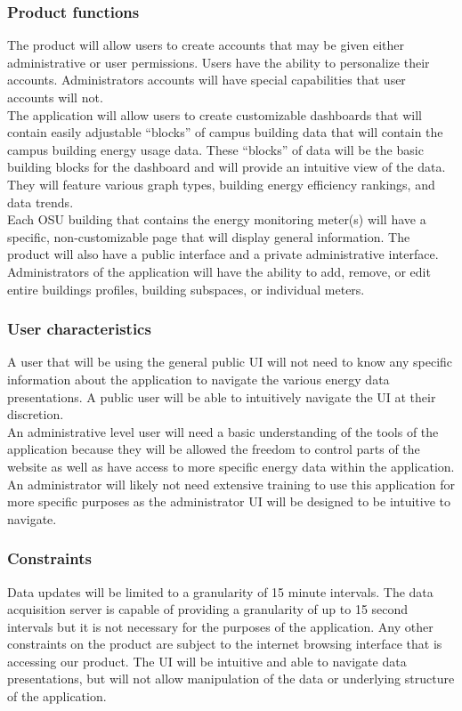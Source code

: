     \subsubsection{Product functions}
    The product will allow users to create accounts that may be given either administrative or user permissions. Users have the ability to personalize their accounts. Administrators accounts will have special capabilities that user accounts will not. \\
    The application will allow users to create customizable dashboards that will contain easily adjustable “blocks” of campus building data that will contain the campus building energy usage data. These “blocks” of data will be the basic building blocks for the dashboard and will provide an intuitive view of the data. They will feature various graph types, building energy efficiency rankings, and data trends.\\
    Each OSU building that contains the energy monitoring meter(s) will have a specific, non-customizable page that will display general information. The product will also have a public interface and a private administrative interface.\\
    Administrators of the application will have the ability to add, remove, or edit entire buildings profiles, building subspaces, or individual meters.
    
    \subsubsection{User characteristics}
    A user that will be using the general public UI will not need to know any specific information about the application to navigate the various energy data presentations. A public user will be able to intuitively navigate the UI at their discretion. \\ 
    An administrative level user will need a basic understanding of the tools of the application because they will be allowed the freedom to control parts of the website as well as have access to more specific energy data within the application. An administrator will likely not need extensive training to use this application for more specific purposes as the administrator UI will be designed to be intuitive to navigate.
    \subsubsection{Constraints}
    Data updates will be limited to a granularity of 15 minute intervals. The data acquisition server is capable of providing a granularity of up to 15 second intervals but it is not necessary for the purposes of the application. Any other constraints on the product are subject to the internet browsing interface that is accessing our product. The UI will be intuitive and able to navigate data presentations, but will not allow manipulation of the data or underlying structure of the application.
    
